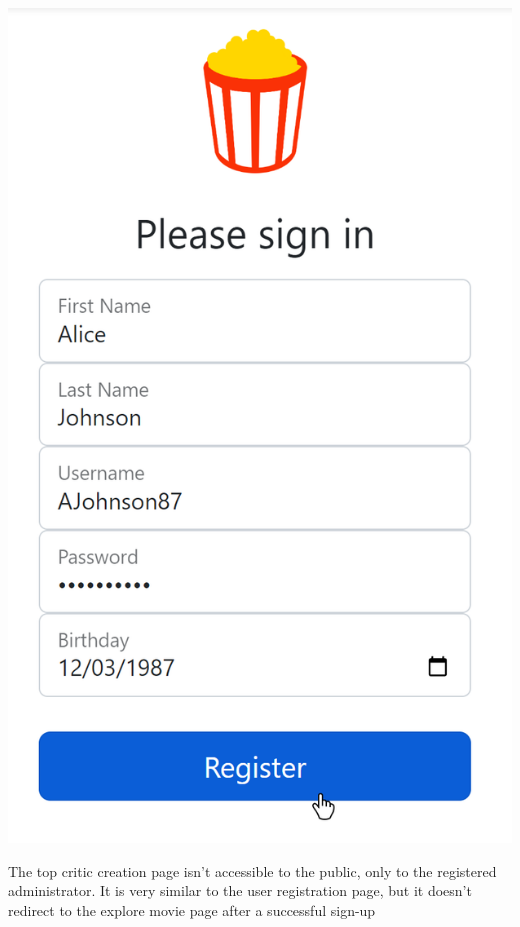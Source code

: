 \begin{center}
\includegraphics[scale=0.45]{../../../images/user_manual/top_critic_registration.png} 

\end{center}
\vspace{5pt}

The top critic creation page isn't accessible to the public, only to the registered administrator. It is very similar to the user registration page, but it doesn't redirect to the explore movie page after a successful sign-up

